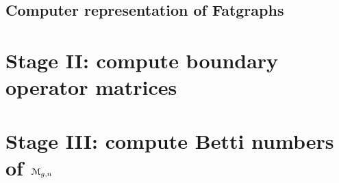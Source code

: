 \subsection{Computer representation of Fatgraphs}
\label{sec:stage1-fatgraphs}



\section[Stage II]{Stage II: compute boundary operator matrices}
\label{sec:stage-ii}

\section[Stage III]{Stage III: compute Betti numbers of $\mathcal{M}_{g,n}$}
\label{sec:stage-iii}



